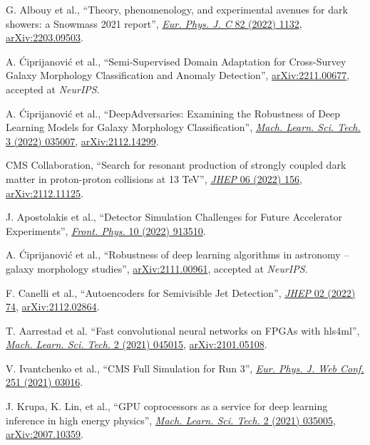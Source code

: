 \begin{nbdescription}[leftmargin=12pt,font=\normalfont,labelsep=0em]
\item G. Albouy et al., ``Theory, phenomenology, and experimental avenues for dark showers: a Snowmass 2021 report'', \href{https://doi.org/10.1140/epjc/s10052-022-11048-8}{\emph{Eur. Phys. J. C} 82 (2022) 1132}, \href{https://arxiv.org/abs/2203.09503}{arXiv:2203.09503}. %
\ifdefined\longflag\item A. \'Ciprijanovi\'c et al., ``Semi-Supervised Domain Adaptation for Cross-Survey Galaxy Morphology Classification and Anomaly Detection'', \href{https://arxiv.org/abs/2211.00677}{arXiv:2211.00677}, accepted at \emph{NeurIPS}.\fi %
\item A. \'Ciprijanovi\'c et al., ``DeepAdversaries: Examining the Robustness of Deep Learning Models for Galaxy Morphology Classification'', \href{https://doi.org/10.1088/2632-2153/ac7f1a}{\emph{Mach. Learn. Sci. Tech.} 3 (2022) 035007}, \href{https://arxiv.org/abs/2112.14299}{arXiv:2112.14299}. %
\item CMS Collaboration, ``Search for resonant production of strongly coupled dark matter in proton-proton collisions at 13 TeV'', \href{https://doi.org/10.1007/JHEP06(2022)156}{\emph{JHEP} 06 (2022) 156}, \href{https://arxiv.org/abs/2112.11125}{arXiv:2112.11125}. %
\item J. Apostolakis et al., ``Detector Simulation Challenges for Future Accelerator Experiments'', \href{https://doi.org/10.3389/fphy.2022.913510}{\emph{Front. Phys.} 10 (2022) 913510}. %
\ifdefined\longflag\item A. \'Ciprijanovi\'c et al., ``Robustness of deep learning algorithms in astronomy -- galaxy morphology studies'', \href{https://arxiv.org/abs/2111.00961}{arXiv:2111.00961}, accepted at \emph{NeurIPS}. \fi %
\item F. Canelli et al., ``Autoencoders for Semivisible Jet Detection'', \href{https://doi.org/10.1007/JHEP02(2022)074}{\emph{JHEP} 02 (2022) 74}, \href{https://arxiv.org/abs/2112.02864}{arXiv:2112.02864}. %
\item T. Aarrestad et al. ``Fast convolutional neural networks on FPGAs with hls4ml'', \href{https://doi.org/10.1088/2632-2153/ac0ea1}{\emph{Mach. Learn. Sci. Tech.} 2 (2021) 045015}, \href{https://arxiv.org/abs/2101.05108}{arXiv:2101.05108}. %
\item V. Ivantchenko et al., ``CMS Full Simulation for Run 3'', \href{https://doi.org/10.1051/epjconf/202125103016}{\emph{Eur. Phys. J. Web Conf.} 251 (2021) 03016}. %
\item J. Krupa, K. Lin, et al., ``GPU coprocessors as a service for deep learning inference in high energy physics'', \href{https://doi.org/10.1088/2632-2153/abec21}{\emph{Mach. Learn. Sci. Tech.} 2 (2021) 035005}, \href{https://arxiv.org/abs/2007.10359}{arXiv:2007.10359}. %

\end{nbdescription}
